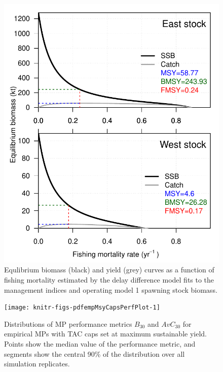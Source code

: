 \documentclass[]{article}
\begin{document}
\begin{figure}[htb]

{\centering \includegraphics[width=0.9\linewidth]{data/AM/1/BRP} 

}

\caption{Equlibrium biomass (black) and yield (grey) curves as a function of fishing mortality estimated by the delay difference model fits to the management indices and operating model 1 spawning stock biomass.}\label{fig:amRefPtsPlot}
\end{figure}

\newpage

\begin{figure}[htb]

{\centering \texttt{[image: knitr-figs-pdfempMsyCapsPerfPlot-1]} 

}

\caption{Distributions of MP performance metrics $B_{30}$ and $AvC_{30}$ for empirical MPs with TAC caps set at maximum sustainable yield. Points show the median value of the performance metric, and segments show the central 90\% of the distribution over all simulation replicates.}\label{fig:empMsyCapsPerfPlot}
\end{figure}

\newpage
\end{document}
